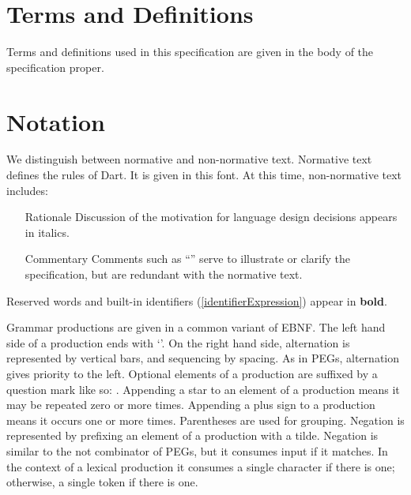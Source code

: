 \documentclass[makeidx]{article}
\begin{document}
\section{Terms and Definitions}

\LMHash{}%
Terms and definitions used in this specification are given in
the body of the specification proper.


\section{Notation}

\LMHash{}%
We distinguish between normative and non-normative text.
Normative text defines the rules of Dart.
It is given in this font.
At this time, non-normative text includes:
\begin{itemize}
\item[Rationale]
  Discussion of the motivation for language design decisions appears in italics.
\item[Commentary]
  Comments such as
  ``''
  serve to illustrate or clarify the specification,
  but are redundant with the normative text.
\end{itemize}

\LMHash{}%
Reserved words and built-in identifiers
(\ref{identifierExpression})
appear in {\bf bold}.


\LMHash{}%
Grammar productions are given in a common variant of EBNF.
The left hand side of a production ends with `\lit{::=}'.
On the right hand side, alternation is represented by vertical bars,
and sequencing by spacing.
As in PEGs, alternation gives priority to the left.
Optional elements of a production are suffixed by a question mark
like so: .
Appending a star to an element of a production means
it may be repeated zero or more times.
Appending a plus sign to a production means it occurs one or more times.
Parentheses are used for grouping.
Negation is represented by prefixing an element of a production with a tilde.
Negation is similar to the not combinator of PEGs,
but it consumes input if it matches.
In the context of a lexical production it consumes
a single character if there is one;
otherwise, a single token if there is one.
\end{document}
